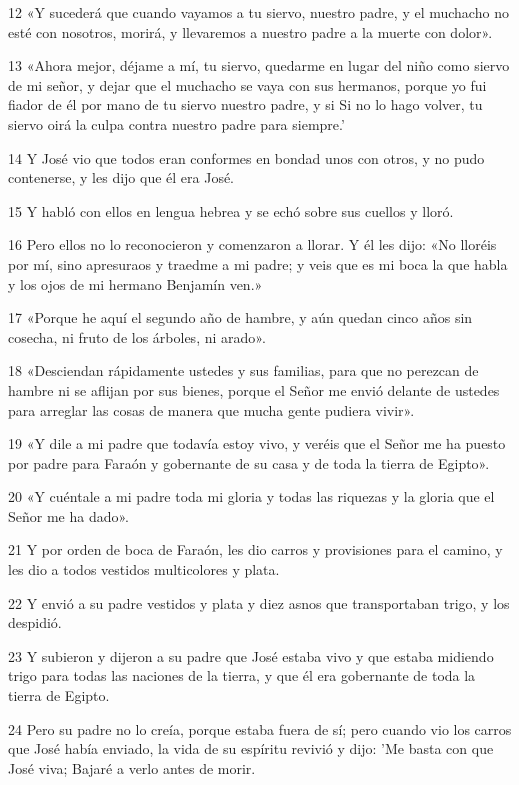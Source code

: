 \par 12 «Y sucederá que cuando vayamos a tu siervo, nuestro padre, y el muchacho no esté con nosotros, morirá, y llevaremos a nuestro padre a la muerte con dolor».
\par 13 «Ahora mejor, déjame a mí, tu siervo, quedarme en lugar del niño como siervo de mi señor, y dejar que el muchacho se vaya con sus hermanos, porque yo fui fiador de él por mano de tu siervo nuestro padre, y si Si no lo hago volver, tu siervo oirá la culpa contra nuestro padre para siempre.'
\par 14 Y José vio que todos eran conformes en bondad unos con otros, y no pudo contenerse, y les dijo que él era José.
\par 15 Y habló con ellos en lengua hebrea y se echó sobre sus cuellos y lloró.
\par 16 Pero ellos no lo reconocieron y comenzaron a llorar. Y él les dijo: «No lloréis por mí, sino apresuraos y traedme a mi padre; y veis que es mi boca la que habla y los ojos de mi hermano Benjamín ven.»
\par 17 «Porque he aquí el segundo año de hambre, y aún quedan cinco años sin cosecha, ni fruto de los árboles, ni arado».
\par 18 «Desciendan rápidamente ustedes y sus familias, para que no perezcan de hambre ni se aflijan por sus bienes, porque el Señor me envió delante de ustedes para arreglar las cosas de manera que mucha gente pudiera vivir».
\par 19 «Y dile a mi padre que todavía estoy vivo, y veréis que el Señor me ha puesto por padre para Faraón y gobernante de su casa y de toda la tierra de Egipto».
\par 20 «Y cuéntale a mi padre toda mi gloria y todas las riquezas y la gloria que el Señor me ha dado».
\par 21 Y por orden de boca de Faraón, les dio carros y provisiones para el camino, y les dio a todos vestidos multicolores y plata.
\par 22 Y envió a su padre vestidos y plata y diez asnos que transportaban trigo, y los despidió.
\par 23 Y subieron y dijeron a su padre que José estaba vivo y que estaba midiendo trigo para todas las naciones de la tierra, y que él era gobernante de toda la tierra de Egipto.
\par 24 Pero su padre no lo creía, porque estaba fuera de sí; pero cuando vio los carros que José había enviado, la vida de su espíritu revivió y dijo: 'Me basta con que José viva; Bajaré a verlo antes de morir.

